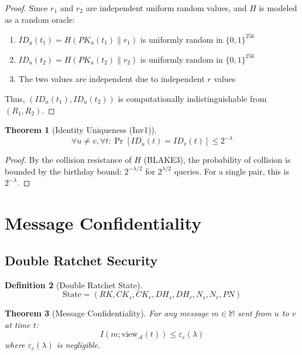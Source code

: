 \documentclass[11pt,a4paper]{article}
\newtheorem{theorem}{Theorem}[section]
\newtheorem{definition}[theorem]{Definition}
\begin{document}
\begin{proof}
Since $r_1$ and $r_2$ are independent uniform random values, and $H$ is modeled as a random oracle:
\begin{enumerate}
    \item $ID_u(t_1) = H(PK_u(t_1) \| r_1)$ is uniformly random in $\{0,1\}^{256}$
    \item $ID_u(t_2) = H(PK_u(t_2) \| r_2)$ is uniformly random in $\{0,1\}^{256}$
    \item The two values are independent due to independent $r$ values
\end{enumerate}
Thus, $(ID_u(t_1), ID_u(t_2))$ is computationally indistinguishable from $(R_1, R_2)$.
\end{proof}

\begin{theorem}[Identity Uniqueness (Inv1)]
$$\forall u \neq v, \forall t: \Pr[ID_u(t) = ID_v(t)] \leq 2^{-\lambda}$$
\end{theorem}

\begin{proof}
By the collision resistance of $H$ (BLAKE3), the probability of collision is bounded by the birthday bound: $2^{-\lambda/2}$ for $2^{\lambda/2}$ queries. For a single pair, this is $2^{-\lambda}$.
\end{proof}

\section{Message Confidentiality}

\subsection{Double Ratchet Security}

\begin{definition}[Double Ratchet State]
$$\text{State} = (RK, CK_s, CK_r, DH_s, DH_r, N_s, N_r, PN)$$
\end{definition}

\begin{theorem}[Message Confidentiality]
For any message $m \in \mathbb{M}$ sent from $u$ to $v$ at time $t$:
$$I(m; \text{view}_{\mathcal{A}}(t)) \leq \varepsilon_c(\lambda)$$
where $\varepsilon_c(\lambda)$ is negligible.
\end{theorem}
\end{document}
